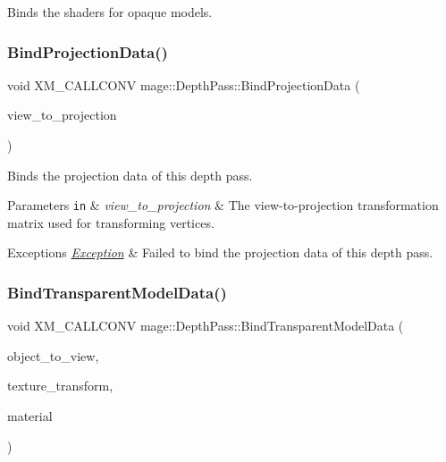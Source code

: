 Binds the shaders for opaque models. \hypertarget{classmage_1_1_depth_pass_a9fa93bf5d67b9396d358e595be55a075}{}\label{classmage_1_1_depth_pass_a9fa93bf5d67b9396d358e595be55a075} 
\subsubsection{\texorpdfstring{Bind\+Projection\+Data()}{BindProjectionData()}}
{\footnotesize\ttfamily void X\+M\+\_\+\+C\+A\+L\+L\+C\+O\+NV mage\+::\+Depth\+Pass\+::\+Bind\+Projection\+Data (\begin{DoxyParamCaption}\item[{F\+X\+M\+M\+A\+T\+R\+IX}]{view\+\_\+to\+\_\+projection }\end{DoxyParamCaption})\hspace{0.3cm}{\ttfamily [private]}}

Binds the projection data of this depth pass.


\begin{DoxyParams}[1]{Parameters}
\mbox{\tt in}  & {\em view\+\_\+to\+\_\+projection} & The view-\/to-\/projection transformation matrix used for transforming vertices. \\
\hline
\end{DoxyParams}

\begin{DoxyExceptions}{Exceptions}
{\em \hyperlink{classmage_1_1_exception}{Exception}} & Failed to bind the projection data of this depth pass. \\
\hline
\end{DoxyExceptions}
\hypertarget{classmage_1_1_depth_pass_a3f7dae474252b416ab6ec42daf3ad9f5}{}\label{classmage_1_1_depth_pass_a3f7dae474252b416ab6ec42daf3ad9f5} 
\subsubsection{\texorpdfstring{Bind\+Transparent\+Model\+Data()}{BindTransparentModelData()}}
{\footnotesize\ttfamily void X\+M\+\_\+\+C\+A\+L\+L\+C\+O\+NV mage\+::\+Depth\+Pass\+::\+Bind\+Transparent\+Model\+Data (\begin{DoxyParamCaption}\item[{F\+X\+M\+M\+A\+T\+R\+IX}]{object\+\_\+to\+\_\+view,  }\item[{C\+X\+M\+M\+A\+T\+R\+IX}]{texture\+\_\+transform,  }\item[{const \hyperlink{classmage_1_1_material}{Material} \&}]{material }\end{DoxyParamCaption})\hspace{0.3cm}{\ttfamily [private]}}

